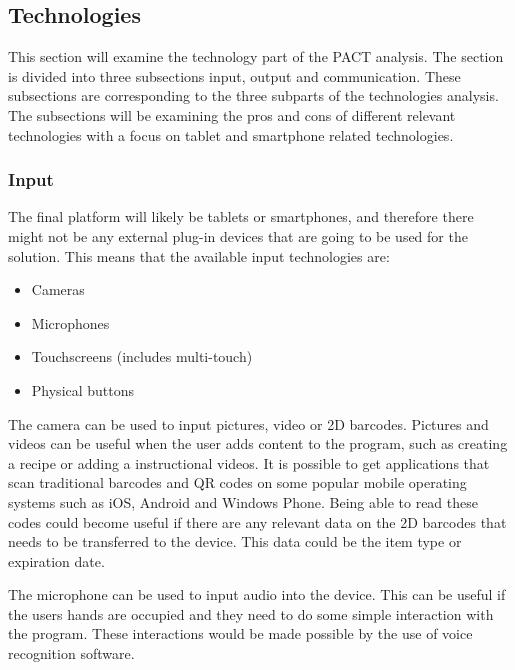 \subsection{Technologies}
This section will examine the technology part of the PACT analysis. The section is divided into three subsections input, output and communication. These subsections are corresponding to the three subparts of the technologies analysis. The subsections will be examining the pros and cons of different relevant technologies with a focus on tablet and smartphone related technologies.

\subsubsection{Input}
The final platform will likely be tablets or smartphones, and therefore there might not be any external plug-in devices that are going to be used for the solution. This means that the available input technologies are:

\begin{itemize}
    \item Cameras
    \item Microphones
    \item Touchscreens (includes multi-touch)
    \item Physical buttons
\end{itemize}

The camera can be used to input pictures, video or 2D barcodes. Pictures and videos can be useful when the user adds content to the program, such as creating a recipe or adding a instructional videos. It is possible to get applications that scan traditional barcodes and QR codes on some popular mobile operating systems such as iOS, Android and Windows Phone\cite{barcode_Phones}. Being able to read these codes could become useful if there are any relevant data on the 2D barcodes that needs to be transferred to the device. This data could be the item type or expiration date\cite{barcodeInc_FAQ}.           
    
The microphone can be used to input audio into the device. This can be useful if the users hands are occupied and they need to do some simple interaction with the program. These interactions would be made possible by the use of voice recognition software.
%

